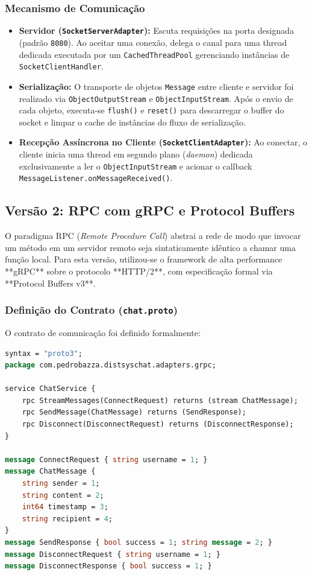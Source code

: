 \documentclass[12pt,a4paper]{article}
\begin{document}
\subsubsection{Mecanismo de Comunicação}
\begin{itemize}
    \item \textbf{Servidor (\texttt{SocketServerAdapter}):} Escuta requisições na porta designada (padrão \texttt{8080}). Ao aceitar uma conexão, delega o canal para uma thread dedicada executada por um \texttt{CachedThreadPool} gerenciando instâncias de \texttt{SocketClientHandler}.
    \item \textbf{Serialização:} O transporte de objetos \texttt{Message} entre cliente e servidor foi realizado via \texttt{ObjectOutputStream} e \texttt{ObjectInputStream}. Após o envio de cada objeto, executa-se \texttt{flush()} e \texttt{reset()} para descarregar o buffer do socket e limpar o cache de instâncias do fluxo de serialização.
    \item \textbf{Recepção Assíncrona no Cliente (\texttt{SocketClientAdapter}):} Ao conectar, o cliente inicia uma thread em segundo plano (\textit{daemon}) dedicada exclusivamente a ler o \texttt{ObjectInputStream} e acionar o callback \texttt{MessageListener.onMessageReceived()}.
\end{itemize}

\subsection{Versão 2: RPC com gRPC e Protocol Buffers}
O paradigma RPC (\textit{Remote Procedure Call}) abstrai a rede de modo que invocar um método em um servidor remoto seja sintaticamente idêntico a chamar uma função local. Para esta versão, utilizou-se o framework de alta performance **gRPC** sobre o protocolo **HTTP/2**, com especificação formal via **Protocol Buffers v3**.

\subsubsection{Definição do Contrato (\texttt{chat.proto})}
O contrato de comunicação foi definido formalmente:
\begin{lstlisting}[language=protobuf]
syntax = "proto3";
package com.pedrobazza.distsyschat.adapters.grpc;

service ChatService {
    rpc StreamMessages(ConnectRequest) returns (stream ChatMessage);
    rpc SendMessage(ChatMessage) returns (SendResponse);
    rpc Disconnect(DisconnectRequest) returns (DisconnectResponse);
}

message ConnectRequest { string username = 1; }
message ChatMessage {
    string sender = 1;
    string content = 2;
    int64 timestamp = 3;
    string recipient = 4;
}
message SendResponse { bool success = 1; string message = 2; }
message DisconnectRequest { string username = 1; }
message DisconnectResponse { bool success = 1; }
\end{lstlisting}
\end{document}
